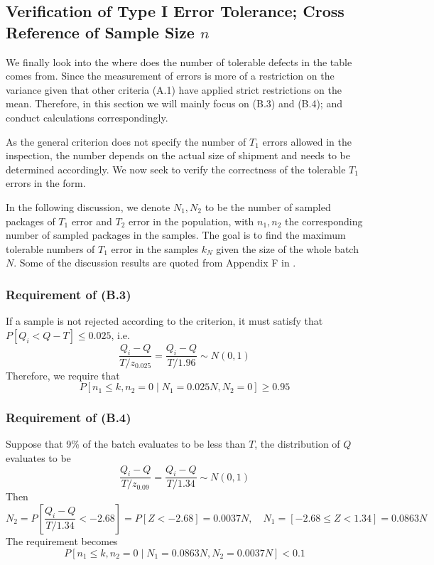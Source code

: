\documentclass[12pt]{article}
\begin{document}
\subsection{Verification of Type I Error Tolerance; Cross Reference of Sample Size $n$}
\label{typeierror}

We finally look into the where does the number of tolerable defects in the table comes from. Since the measurement of errors is more of a restriction on the variance given that other criteria (A.1) have applied strict restrictions on the mean. Therefore, in this section we will mainly focus on (B.3) and (B.4); and conduct calculations correspondingly.

As the general criterion does not specify the number of $T_1$ errors allowed in the inspection, the number depends on the actual size of shipment and needs to be determined accordingly. We now seek to verify the correctness of the tolerable $T_1$ errors in the form. 

In the following discussion, we denote $N_1, N_2$ to be the number of sampled packages of $T_1$ error and $T_2$ error in the population, with $n_1, n_2$ the corresponding number of sampled packages in the samples. The goal is to find the maximum tolerable numbers of $T_1$ error in the samples $k_{N}$ given the size of the whole batch $N$. Some of the discussion results are quoted from Appendix F in \cite{OIML2016}.

\subsubsection{Requirement of (B.3)}

If a sample is not rejected according to the criterion, it must satisfy that $P[Q_i < Q - T] \leq 0.025$, i.e. 
$$
\dfrac{Q_i - Q}{T/z_{0.025}} = \dfrac{Q_i - Q}{T/1.96}\sim N(0,1)
$$
Therefore, we require that
\begin{equation}\label{b3}
    P[n_1\leq k, n_2 = 0\mid N_1 = 0.025N, N_2 = 0] \geq 0.95
\end{equation}

\subsubsection{Requirement of (B.4)}

Suppose that 9\% of the batch evaluates to be less than $T$, the distribution of $Q$ evaluates to be
$$
\dfrac{Q_i - Q}{T/z_{0.09}} = \dfrac{Q_i - Q}{T/1.34}\sim N(0,1)
$$
Then 
$$
N_2 = P[\dfrac{Q_i - Q}{T/1.34} < -2.68] = P[Z < -2.68] = 0.0037N, \quad N_1 = [-2.68\leq Z < 1.34] = 0.0863N
$$
The requirement becomes
\begin{equation}\label{b4}
    P[n_1\leq k, n_2 = 0\mid N_1 = 0.0863N, N_2 = 0.0037N] < 0.1
\end{equation}
\end{document}

